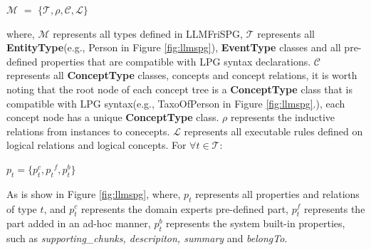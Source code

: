 \documentclass{article}
\begin{document}
\begin{center}
$\mathcal{M}$ $=$ $\{\mathcal{T,\rho, C, L}\}$    
\end{center}
where, $\mathcal{M}$ represents all types defined in LLMFriSPG, $\mathcal{T}$ represents all \textbf{EntityType}(e.g., Person in Figure \ref{fig:llmspg}), \textbf{EventType} classes and all pre-defined properties that are compatible with LPG syntax declarations. $\mathcal{C}$ represents all \textbf{ConceptType} classes, concepts and concept relations, it is worth noting that the root node of each concept tree is a \textbf{ConceptType} class that is compatible with LPG syntax(e.g., TaxoOfPerson in Figure \ref{fig:llmspg}.), each concept node has a unique \textbf{ConceptType} class. $\mathcal{\rho}$ represents the inductive relations from instances to conecepts. $\mathcal{L}$ represents all executable rules defined on logical relations and logical concepts. For $\mathcal{\forall} {t} \in \mathcal{T}$:
\begin{center}
${p_t} = \{p_{t}^{c}, {p_t}^{f}, p_{t}^{b}\}$
\end{center}
As is show in Figure \ref{fig:llmspg}, where, $p_{t}$ represents all properties and relations of type $t$, and $p_{t}^{c}$ represents the domain experts pre-defined part, $p_{t}^{f}$ represents the part added in an ad-hoc manner, $p_{t}^{b}$ represents the system built-in properties, such as \textit{supporting\_chunks, descripiton, summary} and \textit{belongTo}. 
\end{document}
